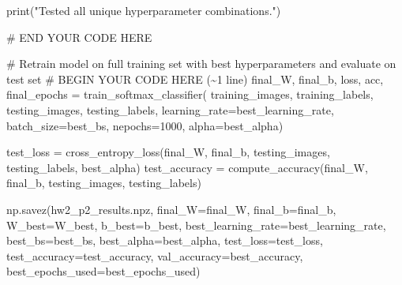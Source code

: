 \documentclass[
  letterpaper,
  DIV=11,
  numbers=noendperiod]{scrartcl}
\newenvironment{Shaded}{\begin{snugshade}}{\end{snugshade}}
\newcommand{\BuiltInTok}[1]{\textcolor[rgb]{0.00,0.23,0.31}{#1}}
\newcommand{\CommentTok}[1]{\textcolor[rgb]{0.37,0.37,0.37}{#1}}
\newcommand{\DecValTok}[1]{\textcolor[rgb]{0.68,0.00,0.00}{#1}}
\newcommand{\NormalTok}[1]{\textcolor[rgb]{0.00,0.23,0.31}{#1}}
\newcommand{\OperatorTok}[1]{\textcolor[rgb]{0.37,0.37,0.37}{#1}}
\newcommand{\RegionMarkerTok}[1]{\textcolor[rgb]{0.00,0.23,0.31}{#1}}
\newcommand{\StringTok}[1]{\textcolor[rgb]{0.13,0.47,0.30}{#1}}
\begin{document}
\begin{Shaded}
\begin{Highlighting}[]
\BuiltInTok{print}\NormalTok{(}\StringTok{"Tested all unique hyperparameter combinations."}\NormalTok{)}
    
    \CommentTok{\# }\RegionMarkerTok{END}\CommentTok{ YOUR CODE HERE}

\CommentTok{\# Retrain model on full training set with best hyperparameters and evaluate on test set}
\CommentTok{\# }\RegionMarkerTok{BEGIN}\CommentTok{ YOUR CODE HERE (\textasciitilde{}1 line)}
\NormalTok{final\_W, final\_b, loss, acc, final\_epochs }\OperatorTok{=}\NormalTok{ train\_softmax\_classifier(}
\NormalTok{    training\_images, training\_labels, testing\_images, testing\_labels,}
\NormalTok{    learning\_rate}\OperatorTok{=}\NormalTok{best\_learning\_rate, batch\_size}\OperatorTok{=}\NormalTok{best\_bs, nepochs}\OperatorTok{=}\DecValTok{1000}\NormalTok{, alpha}\OperatorTok{=}\NormalTok{best\_alpha)}

\NormalTok{test\_loss }\OperatorTok{=}\NormalTok{ cross\_entropy\_loss(final\_W, final\_b, testing\_images, testing\_labels, best\_alpha)}
\NormalTok{test\_accuracy }\OperatorTok{=}\NormalTok{ compute\_accuracy(final\_W, final\_b, testing\_images, testing\_labels)}

\NormalTok{np.savez(}\StringTok{\textquotesingle{}hw2\_p2\_results.npz\textquotesingle{}}\NormalTok{, }
\NormalTok{        final\_W}\OperatorTok{=}\NormalTok{final\_W, final\_b}\OperatorTok{=}\NormalTok{final\_b, W\_best}\OperatorTok{=}\NormalTok{W\_best, b\_best}\OperatorTok{=}\NormalTok{b\_best,}
\NormalTok{        best\_learning\_rate}\OperatorTok{=}\NormalTok{best\_learning\_rate, best\_bs}\OperatorTok{=}\NormalTok{best\_bs, best\_alpha}\OperatorTok{=}\NormalTok{best\_alpha,}
\NormalTok{        test\_loss}\OperatorTok{=}\NormalTok{test\_loss, test\_accuracy}\OperatorTok{=}\NormalTok{test\_accuracy,}
\NormalTok{        val\_accuracy}\OperatorTok{=}\NormalTok{best\_accuracy, best\_epochs\_used}\OperatorTok{=}\NormalTok{best\_epochs\_used)}
    
\end{Highlighting}
\end{Shaded}
\end{document}
